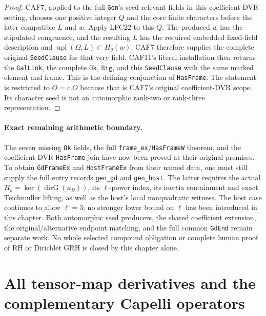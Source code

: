 \documentclass[11pt,a4paper]{article}
\numberwithin{equation}{section}
\theoremstyle{remark}\newtheorem{remark}[theorem]{Remark}
\begin{document}
\begin{proof}
CAF7, applied to the full \texttt{Gen}'s seed-relevant
fields in this coefficient-DVR setting, chooses one
positive integer \(Q\) and the core finite characters
before the later compatible \(L\) and \(w\).
Apply LFC22 to this \(Q\).  The produced \(w\) has
the stipulated congruence, and the resulting \(L\)
has the required embedded fixed-field description
and \(\operatorname{upl}(\Omega,L)\subset H_\theta(w)\).
CAF7 therefore supplies the complete original
\texttt{Seed\allowbreak Clause} for that very field.
CAF11's literal installation then returns the
\texttt{Gal\allowbreak Link}, the complete \(\texttt{Ok}\),
\(\texttt{Big}\), and this \texttt{Seed\allowbreak Clause} with
the same marked element and frame.
This is the defining conjunction of \texttt{Has\allowbreak Frame}.
The statement is restricted to \(O=c.O\) because that
is CAF7's original coefficient-DVR scope.
Its character seed is not an automorphic rank-two
or rank-three representation.
\end{proof}

\paragraph{Exact remaining arithmetic boundary.}
The seven missing \texttt{Ok} fields, the full
\texttt{frame\_\allowbreak ex}/\texttt{Has\allowbreak Frame\allowbreak W} theorem, and
the coefficient-DVR \texttt{Has\allowbreak Frame} join have now
been proved at their original premises.
To obtain \texttt{Gd\allowbreak Frame\allowbreak Ex} and \texttt{Host\allowbreak Frame\allowbreak Ex}
from their named data, one must still supply the full
entry records \texttt{gen\_\allowbreak gd} and \texttt{gen\_\allowbreak host}.
The latter requires the actual
\(H_b=\ker(\operatorname{dirG}(\kappa_B))\), its
\(\ell\)-power index, its inertia containment and exact
Teichmuller lifting, as well as the host's local
nonquadratic witness.  The host case continues to
allow \(\ell=3\); no stronger lower bound on \(\ell\)
has been introduced in this chapter.
Both automorphic seed producers, the shared coefficient
extension, the original/alternative endpoint matching,
and the full common \texttt{Gd\allowbreak End} remain separate work.
No whole selected compound obligation or complete
human proof of RH or Dirichlet GRH is closed by this
chapter alone.


\section{All tensor-map derivatives and the complementary Capelli operators}
\label{sec:bessel-shift-suppliers-v51}
\end{document}
